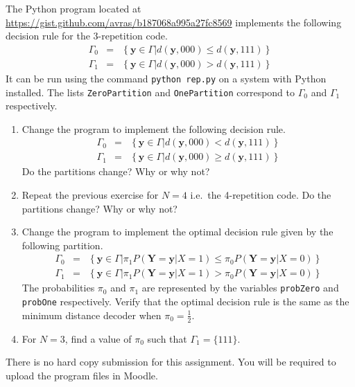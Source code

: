 \documentclass[10pt]{report}
\begin{document}
  The Python program located at \url{https://gist.github.com/avras/b187068a995a27fc8569} implements the following decision rule for the 3-repetition code. 
    \begin{eqnarray*}
      \Gamma_0 & = & \left\{ \mathbf{y} \in \Gamma \bigg|  d(\mathbf{y}, 000) \leq   d(\mathbf{y}, 111)\right\} \\
      \Gamma_1 & = & \left\{ \mathbf{y} \in \Gamma \bigg|  d(\mathbf{y}, 000) >   d(\mathbf{y}, 111)\right\}
    \end{eqnarray*}
It can be run using the command \texttt{python rep.py} on a system with Python installed. The lists \texttt{ZeroPartition} and \texttt{OnePartition} correspond to $\Gamma_0$ and $\Gamma_1$ respectively.
\begin{enumerate}
  \item Change the program to implement the following decision rule.
    \begin{eqnarray*}
      \Gamma_0 & = & \left\{ \mathbf{y} \in \Gamma \bigg|  d(\mathbf{y}, 000) <   d(\mathbf{y}, 111)\right\} \\
      \Gamma_1 & = & \left\{ \mathbf{y} \in \Gamma \bigg|  d(\mathbf{y}, 000) \geq   d(\mathbf{y}, 111)\right\}
    \end{eqnarray*}
    Do the partitions change? Why or why not?
  \item Repeat the previous exercise for $N=4$ i.e.~the 4-repetition code. Do the partitions change? Why or why not?
  \item Change the program to implement the optimal decision rule given by the following partition.
    \begin{eqnarray*}
      \Gamma_0 & = & \left\{ \mathbf{y} \in \Gamma \bigg| \pi_1 P(\mathbf{Y} = \mathbf{y} | X = 1)  \leq  \pi_0 P(\mathbf{Y} = \mathbf{y} | X = 0)\right\} \\
      \Gamma_1 & = & \left\{ \mathbf{y} \in \Gamma \bigg| \pi_1 P(\mathbf{Y} = \mathbf{y} | X = 1)  >  \pi_0 P(\mathbf{Y} = \mathbf{y} | X = 0)\right\}
    \end{eqnarray*}
    The probabilities $\pi_0$ and $\pi_1$ are represented by the variables \texttt{probZero} and \texttt{probOne} respectively. Verify that the optimal decision rule is the same as the minimum distance decoder when $\pi_0 = \frac{1}{2}$.
  \item For $N = 3$, find a value of $\pi_0$ such that $\Gamma_1 = \{111\}$.
\end{enumerate}
There is no hard copy submission for this assignment. You will be required to upload the program files in Moodle.
\end{document}
